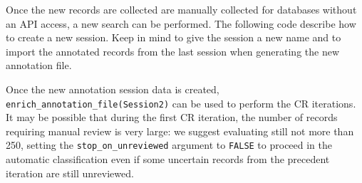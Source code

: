 \documentclass[
]{article}
\newenvironment{Shaded}{\begin{snugshade}}{\end{snugshade}}
\newcommand{\AttributeTok}[1]{\textcolor[rgb]{0.77,0.63,0.00}{#1}}
\newcommand{\CommentTok}[1]{\textcolor[rgb]{0.56,0.35,0.01}{\textit{#1}}}
\newcommand{\FunctionTok}[1]{\textcolor[rgb]{0.00,0.00,0.00}{#1}}
\newcommand{\NormalTok}[1]{#1}
\newcommand{\OtherTok}[1]{\textcolor[rgb]{0.56,0.35,0.01}{#1}}
\newcommand{\SpecialCharTok}[1]{\textcolor[rgb]{0.00,0.00,0.00}{#1}}
\newcommand{\StringTok}[1]{\textcolor[rgb]{0.31,0.60,0.02}{#1}}
\begin{document}
Once the new records are collected are manually collected for databases
without an API access, a new search can be performed. The following code
describe how to create a new session. Keep in mind to give the session a
new name and to import the annotated records from the last session when
generating the new annotation file.

\begin{Shaded}
\end{Shaded}

Once the new annotation session data is created,
\texttt{enrich\_annotation\_file(\textquotesingle{}Session2\textquotesingle{})}
can be used to perform the CR iterations. It may be possible that during
the first CR iteration, the number of records requiring manual review is
very large: we suggest evaluating still not more than 250, setting the
\texttt{stop\_on\_unreviewed} argument to \texttt{FALSE} to proceed in
the automatic classification even if some uncertain records from the
precedent iteration are still unreviewed.
\end{document}
